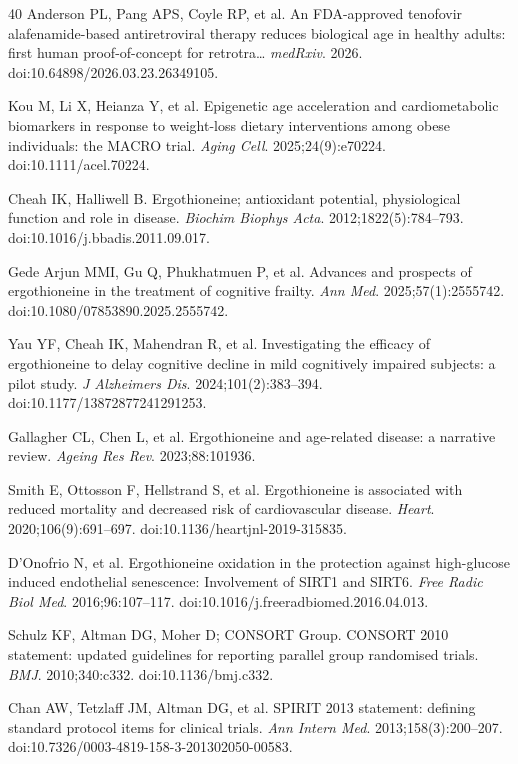 \documentclass[11pt,a4paper]{article}
\begin{document}
\begin{thebibliography}{40}
Anderson PL, Pang APS, Coyle RP, et al.
An FDA-approved tenofovir alafenamide-based antiretroviral therapy reduces biological age in healthy adults: first human proof-of-concept for retrotra\ldots
\textit{medRxiv}. 2026.
doi:10.64898/2026.03.23.26349105.

Kou M, Li X, Heianza Y, et al.
Epigenetic age acceleration and cardiometabolic biomarkers in response to weight-loss dietary interventions among obese individuals: the MACRO trial.
\textit{Aging Cell}. 2025;24(9):e70224.
doi:10.1111/acel.70224.

Cheah IK, Halliwell B.
Ergothioneine; antioxidant potential, physiological function and role in disease.
\textit{Biochim Biophys Acta}. 2012;1822(5):784--793.
doi:10.1016/j.bbadis.2011.09.017.

Gede Arjun MMI, Gu Q, Phukhatmuen P, et al.
Advances and prospects of ergothioneine in the treatment of cognitive frailty.
\textit{Ann Med}. 2025;57(1):2555742.
doi:10.1080/07853890.2025.2555742.

Yau YF, Cheah IK, Mahendran R, et al.
Investigating the efficacy of ergothioneine to delay cognitive decline in mild cognitively impaired subjects: a pilot study.
\textit{J Alzheimers Dis}. 2024;101(2):383--394.
doi:10.1177/13872877241291253.

Gallagher CL, Chen L, et al.
Ergothioneine and age-related disease: a narrative review.
\textit{Ageing Res Rev}. 2023;88:101936.

Smith E, Ottosson F, Hellstrand S, et al.
Ergothioneine is associated with reduced mortality and decreased risk of cardiovascular disease.
\textit{Heart}. 2020;106(9):691--697.
doi:10.1136/heartjnl-2019-315835.

D{\textquoteright}Onofrio N, et al.
Ergothioneine oxidation in the protection against high-glucose induced endothelial senescence: Involvement of SIRT1 and SIRT6.
\textit{Free Radic Biol Med}. 2016;96:107--117.
doi:10.1016/j.freeradbiomed.2016.04.013.

Schulz KF, Altman DG, Moher D; CONSORT Group.
CONSORT 2010 statement: updated guidelines for reporting parallel group randomised trials.
\textit{BMJ}. 2010;340:c332.
doi:10.1136/bmj.c332.

Chan AW, Tetzlaff JM, Altman DG, et al.
SPIRIT 2013 statement: defining standard protocol items for clinical trials.
\textit{Ann Intern Med}. 2013;158(3):200--207.
doi:10.7326/0003-4819-158-3-201302050-00583.


\end{thebibliography}
\end{document}
